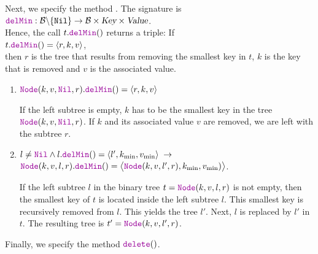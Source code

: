 Next, we specify the  method .  The signature is
\\[0.2cm]
\hspace*{1.3cm}
$\mytt{delMin}:\mathcal{B} \backslash \{ \mathtt{Nil} \} \rightarrow \mathcal{B} \times \textsl{Key} \times \textsl{Value}$.
\\[0.2cm]
Hence, the call $t.\mytt{delMin}()$ returns a triple: If 
\\[0.2cm]
\hspace*{1.3cm}
$t.\mytt{delMin}() = \langle r,k,v \rangle$,
\\[0.2cm]
then $r$ is the tree that  results from
removing the smallest key in $t$, $k$ is the key that is removed and $v$ is the associated value.
\begin{enumerate}
\item $\mytt{Node}(k, v, \mytt{Nil}, r).\mytt{delMin}() = \langle r, k, v\rangle$

      If the left subtree is empty, $k$ has to be the smallest key in the tree 
      $\mytt{Node}(k, v, \mytt{Nil}, r)$.  If $k$ and its associated value $v$ are removed, we are left with the subtree $r$.
\item $l\not= \mytt{Nil} \wedge l.\mytt{delMin}() = \langle l',k_{\textrm{min}}, v_{\textrm{min}}\rangle \;\rightarrow$ \\[0.2cm]
       \hspace*{1.3cm} 
       $\mytt{Node}(k, v, l, r).\mytt{delMin}() = \bigl\langle\mytt{Node}(k, v, l', r), k_{\textrm{min}}, v_{\textrm{min}})\bigr\rangle$.

      If the left subtree $l$ in the binary tree $t = \mytt{Node}(k, v, l, r)$
      is not empty, then the smallest key of  $t$ is located inside the left subtree $l$.
      This smallest key is recursively removed from  $l$. This yields the tree 
      $l'$.  Next,  $l$ is replaced by $l'$ in $t$.  The resulting tree is
      $t' = \mytt{Node}(k, v, l', r)$.
\end{enumerate}
Finally, we specify the method $\mytt{delete}()$.
